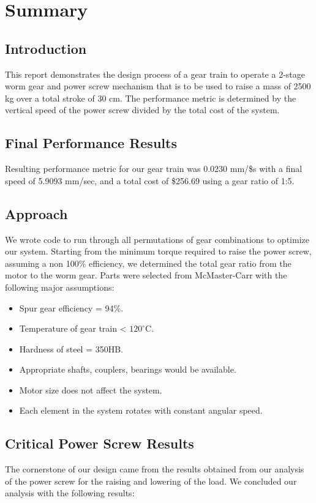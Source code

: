 \documentclass[letterpaper,12pt]{article}
\begin{document}
\section{Summary}

\subsection{Introduction}
This report demonstrates the design process of a gear train to operate a 2-stage worm gear and power screw mechanism that is to be used to raise a mass of 2500 kg over a total stroke of 30 cm. The performance metric is determined by the vertical speed of the power screw divided by the total cost of the system. 

\subsection{Final Performance Results}
Resulting performance metric for our gear train was 0.0230 mm/\$s with a final speed of 5.9093 mm/sec, and a total cost of \$256.69 using a gear ratio of 1:5. 

\subsection{Approach}
We wrote code to run through all permutations of gear combinations to optimize our system. Starting from the minimum torque required to raise the power screw, assuming a non 100\% efficiency, we determined the total gear ratio from the motor to the worm gear. Parts were selected from McMaster-Carr with the following major assumptions:
\begin{itemize}
    \item Spur gear efficiency = 94\%.
    \item Temperature of gear train < $120^{\circ}$C.
    \item Hardness of steel = 350HB.
    \item Appropriate shafts, couplers, bearings would be available.
    \item Motor size does not affect the system.
    \item Each element in the system rotates with constant angular speed.
\end{itemize}

\subsection{Critical Power Screw Results}
The cornerstone of our design came from the results obtained from our analysis of the power screw for the raising and lowering of the load. We concluded our analysis with the following results:
\end{document}
